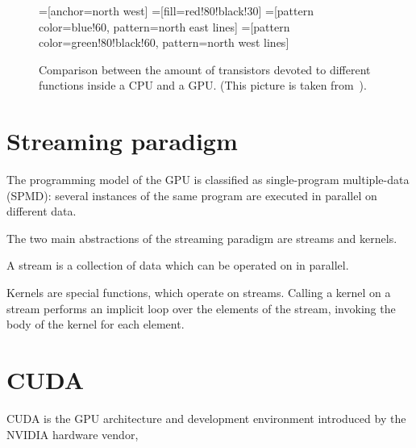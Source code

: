 \begin{figure}
  \centering
  =[anchor=north west]
  =[fill=red!80!black!30]
  =[pattern color=blue!60, pattern=north east lines]
  =[pattern color=green!80!black!60, pattern=north west lines]
  \label{fig:transistors}
  \caption{
    Comparison between the amount of transistors
    devoted to different functions inside a CPU and a GPU.
    (This picture is taken from~\cite[\S1]{cudaprog2}).
  }
\end{figure}


\section{Streaming paradigm}

The programming model of the GPU is classified as single-program multiple-data (SPMD):
several instances of the same program are executed in parallel
on different data.

The two main abstractions of the streaming paradigm are streams and kernels.

A stream is a collection of data which can be operated on in parallel.

Kernels are special functions, which operate on streams.
Calling a kernel on a stream
performs an implicit loop over the elements of the stream,
invoking the body of the kernel for each element.


\section{CUDA}

CUDA is the GPU architecture and development environment
introduced by the NVIDIA hardware vendor,








